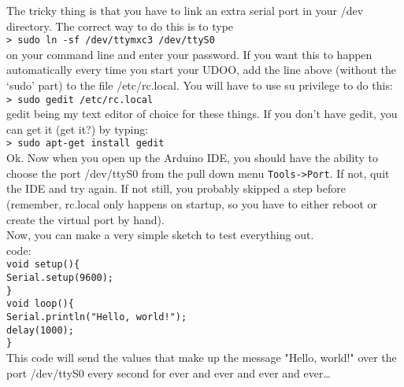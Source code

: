 \documentclass{article}
\begin{document}
The tricky thing is that you have to link an extra serial port in your /dev directory. The correct way to do this is to type\\ 

\texttt{\textgreater{} sudo ln -sf /dev/ttymxc3 /dev/ttyS0}\\

on your command line and enter your password. If you want this to happen automatically every time you start your UDOO, add the line above (without the `sudo' part) to the file /etc/rc.local. You will have to use su privilege to do this:\\

\texttt{\textgreater{} sudo gedit /etc/rc.local}\\ 

gedit being my text editor of choice for these things. If you don't have gedit, you can get it (get it?) by typing:\\

\texttt{\textgreater{} sudo apt-get install gedit}\\

Ok. Now when you open up the Arduino IDE, you should have the ability to choose the port /dev/ttyS0 from the pull down menu \texttt{Tools-\textgreater{}Port}. If not, quit the IDE and try again. If not still, you probably skipped a step before (remember, rc.local only happens on startup, so you have to either reboot or create the virtual port by hand).\\

Now, you can make a very simple sketch to test everything out.\\

code:\\

\texttt{void setup()\{}\\
\texttt{Serial.setup(9600);}\\
\texttt{\}}\\

\texttt{void loop()\{}\\

\texttt{Serial.println("Hello, world!");}\\
\texttt{delay(1000);}\\

\texttt{\}}\\

This code will send the values that make up the message "Hello, world!" over the port /dev/ttyS0 every second for ever and ever and ever and ever\ldots{}\\
\end{document}
